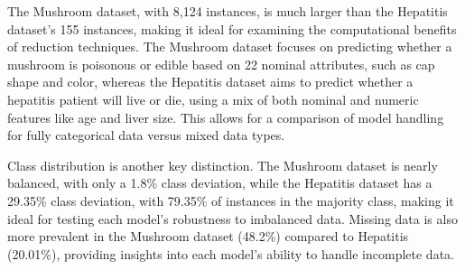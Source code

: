 The Mushroom dataset, with 8,124 instances, is much larger than the Hepatitis dataset’s 155 instances, making it ideal for examining the computational benefits of reduction techniques.
The Mushroom dataset focuses on predicting whether a mushroom is poisonous or edible based on 22 nominal attributes, such as cap shape and color, whereas the Hepatitis dataset aims to predict whether a hepatitis patient will live or die, using a mix of both nominal and numeric features like age and liver size.
This allows for a comparison of model handling for fully categorical data versus mixed data types.

Class distribution is another key distinction.
The Mushroom dataset is nearly balanced, with only a 1.8\% class deviation, while the Hepatitis dataset has a 29.35\% class deviation, with 79.35\% of instances in the majority class, making it ideal for testing each model’s robustness to imbalanced data.
Missing data is also more prevalent in the Mushroom dataset (48.2\%) compared to Hepatitis (20.01\%), providing insights into each model’s ability to handle incomplete data.
